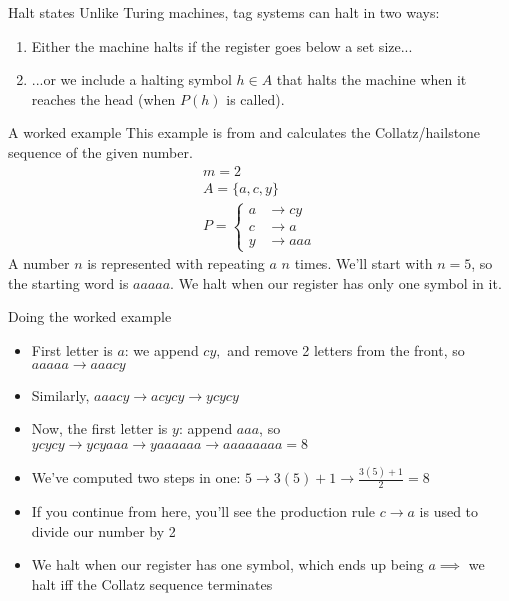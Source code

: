 \documentclass[aspectratio=169]{beamer}
\begin{document}
\begin{frame}{Halt states}
    Unlike Turing machines, tag systems can halt in two ways: \pause
    \begin{enumerate}
        \item Either the machine halts if the register goes below a set size... \pause
        \item ...or we include a halting symbol $h \in A$ that halts the machine when it reaches the head (when $P(h)$ is called).
    \end{enumerate}
\end{frame}

\begin{frame}{A worked example}
    This example is from \cite{DEMOL200892} and calculates the Collatz/hailstone sequence of the given number.
\begin{gather*}
    m = 2 \\
    A = \{a, c, y\} \\
    P = \begin{cases}
        a &\rightarrow cy \\
        c &\rightarrow a \\
        y &\rightarrow aaa
    \end{cases}
\end{gather*}
A number $n$ is represented with repeating $a$ $n$ times. We'll start with $n = 5$, so the starting word is $aaaaa.$ We halt when our register has only one symbol in it.
\end{frame}

\begin{frame}{Doing the worked example}
\begin{itemize}
    \item First letter is $a$: we append $cy,$ and remove 2 letters from the front, so $aaaaa \rightarrow aaacy$ \pause
    \item Similarly, $aaacy \rightarrow acycy \rightarrow ycycy$ \pause
    \item Now, the first letter is $y$: append $aaa$, so $ycycy \rightarrow ycyaaa \rightarrow yaaaaaa \rightarrow aaaaaaaa = 8$ \pause
    \item We've computed two steps in one: $5 \rightarrow 3(5) + 1 \rightarrow \frac{3(5) + 1}{2} = 8$ \pause
    \item If you continue from here, you'll see the production rule $c \rightarrow a$ is used to divide our number by 2 \pause
    \item We halt when our register has one symbol, which ends up being $a \implies$ we halt iff the Collatz sequence terminates
\end{itemize}
\end{frame}
\end{document}
